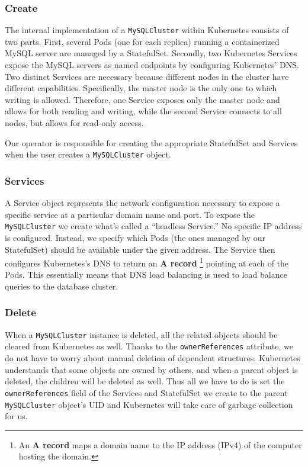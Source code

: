\subsubsection*{Create}
The internal implementation of a \texttt{MySQLCluster} within Kubernetes consists of two parts. First,
several Pods (one for each replica) running a containerized MySQL server are managed by a
StatefulSet. Secondly, two Kubernetes Services expose the MySQL servers as named endpoints by
configuring Kubernetes’ DNS. Two distinct Services are necessary because different nodes in the
cluster have different capabilities. Specifically, the master node is the only one to which writing
is allowed. Therefore, one Service exposes only the  master node and allows for both reading and
writing, while the second Service connects to all nodes, but allows for read-only access. 

Our operator is responsible for creating the appropriate StatefulSet and Services when the user
creates a \texttt{MySQLCluster} object.

\subsubsection*{Services}
A Service object represents the network configuration necessary to expose a specific service at a
particular domain name and port. To expose the \texttt{MySQLCluster} we create what’s called a
“headless Service.” No specific IP address is configured. Instead, we specify which Pods (the ones
managed by our StatefulSet) should be available under the given address. The Service then configures
Kubernetes’s DNS to return an \textbf{A record} \footnote{An \textbf{A record} maps a domain name to
the IP address (IPv4) of the computer hosting the domain.} pointing at each of the Pods. This
essentially means that DNS load balancing is used to load balance queries to the database cluster.

\subsubsection*{Delete}
When a \texttt{MySQLCluster} instance is deleted, all the related objects should be cleared from Kubernetes
as well. Thanks to the \texttt{ownerReferences} attribute, we do not have to worry about manual
deletion of dependent structures. Kubernetes understands that some objects are owned by others, and
when a parent object is deleted, the children will be deleted as well. Thus all we have to do is set
the \texttt{ownerReferences} field of the Services and StatefulSet we create to the parent
\texttt{MySQLCluster} object’s UID and Kubernetes will take care of garbage collection for us.

